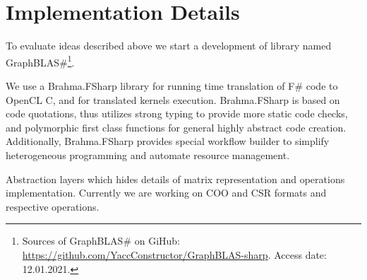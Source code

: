 \section{Implementation Details}

To evaluate ideas described above we start a development of library named GraphBLAS\#\footnote{Sources of GraphBLAS\# on GiHub: \url{https://github.com/YaccConstructor/GraphBLAS-sharp}. Access date: 12.01.2021.}.

We use a Brahma.FSharp library for running time translation of F\# code to OpenCL C, and for translated kernels execution. 
Brahma.FSharp is based on code quotations, thus utilizes strong typing to provide more static code checks, and polymorphic first class functions for general highly abstract code creation.
Additionally, Brahma.FSharp provides special workflow builder to simplify heterogeneous programming and automate resource management.  

Abstraction layers which hides details of matrix representation and operations implementation.
Currently we are working on COO and CSR formats and respective operations.